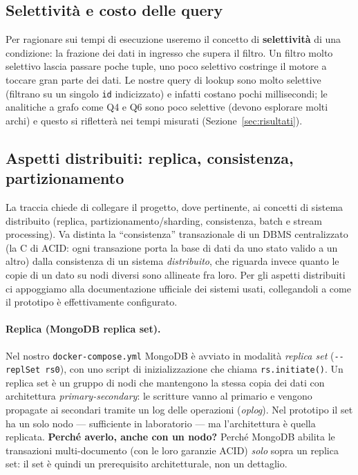 \documentclass[11pt,a4paper]{article}
\begin{document}
\subsection{Selettivit\`a e costo delle query}

Per ragionare sui tempi di esecuzione useremo il concetto di
\textbf{selettivit\`a} di una condizione: la frazione dei dati in ingresso che
supera il filtro. Un filtro molto selettivo lascia passare poche tuple, uno
poco selettivo costringe il motore a toccare gran parte dei dati.
Le nostre query di lookup sono molto selettive (filtrano su un singolo
\texttt{id} indicizzato) e infatti costano pochi millisecondi; le analitiche a
grafo come Q4 e Q6 sono poco selettive (devono esplorare molti archi) e questo
si rifletter\`a nei tempi misurati (Sezione~\ref{sec:risultati}).

\subsection{Aspetti distribuiti: replica, consistenza, partizionamento}
\label{sec:distr}

La traccia chiede di collegare il progetto, dove pertinente, ai concetti di
sistema distribuito (replica, partizionamento/sharding, consistenza, batch e
stream processing). Va distinta la ``consistenza'' transazionale di un DBMS
centralizzato (la C di ACID: ogni transazione porta la base di dati da uno stato
valido a un altro) dalla consistenza di un sistema \emph{distribuito}, che
riguarda invece quanto le copie di un dato su nodi diversi sono allineate fra
loro. Per gli aspetti distribuiti ci appoggiamo alla documentazione ufficiale
dei sistemi usati, collegandoli a come il prototipo \`e effettivamente
configurato.

\paragraph{Replica (MongoDB replica set).} Nel nostro
\texttt{docker-compose.yml} MongoDB \`e avviato in modalit\`a \emph{replica set}
(\texttt{-{}-replSet rs0}), con uno script di inizializzazione che chiama
\texttt{rs.initiate()}. Un replica set \`e un gruppo di nodi che mantengono la
stessa copia dei dati con architettura \emph{primary-secondary}: le scritture
vanno al primario e vengono propagate ai secondari tramite un log delle
operazioni (\emph{oplog}). Nel prototipo il set ha un solo nodo --- sufficiente
in laboratorio --- ma l'architettura \`e quella replicata. \textbf{Perch\'e
averlo, anche con un nodo?} Perch\'e MongoDB abilita le transazioni
multi-documento (con le loro garanzie ACID) \emph{solo} sopra un replica set: il
set \`e quindi un prerequisito architetturale, non un dettaglio.
\end{document}
